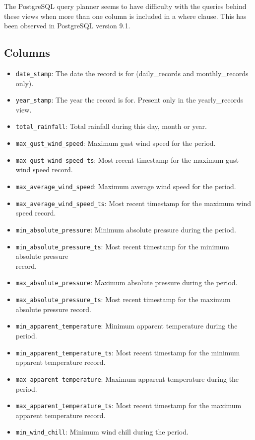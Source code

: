 \documentclass[a4paper,10pt]{book}
\begin{document}
The PostgreSQL query planner seems to have difficulty with the queries behind these views when more than one column is included in a where clause. This has been observed in PostgreSQL version 9.1.

\subsection{Columns}
\begin{itemize}
\item \verb|date_stamp|: The date the record is for (daily\_records and monthly\_records only).
\item \verb|year_stamp|: The year the record is for. Present only in the yearly\_records view.
\item \verb|total_rainfall|: Total rainfall during this day, month or year.
\item \verb|max_gust_wind_speed|: Maximum gust wind speed for the period.
\item \verb|max_gust_wind_speed_ts|: Most recent timestamp for the maximum gust wind speed record.
\item \verb|max_average_wind_speed|: Maximum average wind speed for the period.
\item \verb|max_average_wind_speed_ts|: Most recent timestamp for the maximum wind speed record.
\item \verb|min_absolute_pressure|: Minimum absolute pressure during the period.
\item \verb|min_absolute_pressure_ts|: Most recent timestamp for the minimum absolute pressure \\ record.
\item \verb|max_absolute_pressure|: Maximum absolute pressure during the period.
\item \verb|max_absolute_pressure_ts|: Most recent timestamp for the maximum absolute pressure record.
\item \verb|min_apparent_temperature|: Minimum apparent temperature during the period.
\item \verb|min_apparent_temperature_ts|: Most recent timestamp for the minimum apparent temperature record.
\item \verb|max_apparent_temperature|: Maximum apparent temperature during the period.
\item \verb|max_apparent_temperature_ts|: Most recent timestamp for the maximum apparent temperature record.
\item \verb|min_wind_chill|: Minimum wind chill during the period.

\end{itemize}
\end{document}
